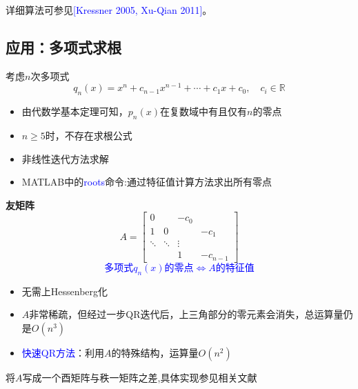 \documentclass[12pt,a4paper]{article}
\begin{document}
详细算法可参见\textcolor{blue}{[Kressner 2005, Xu-Qian 2011]}。
\subsection{应用：多项式求根}
考虑$n$次多项式$$
q_{n}(x)=x^{n}+c_{n-1} x^{n-1}+\cdots+c_{1} x+c_{0}, \quad c_{i} \in \mathbb{R}
$$
\begin{itemize}
	\item 由代数学基本定理可知，$p_n(x)$在复数域中有且仅有$n$的零点
	\item $n\geq 5$时，不存在求根公式
	\item 非线性迭代方法求解
	\item MATLAB中的\textcolor{blue}{roots}命令:通过特征值计算方法求出所有零点
\end{itemize}
\textbf{友矩阵}
$$
A=\left[\begin{array}{cccc}{0} & {} & {-c_{0}} \\ {1} & {0} & {} & {-c_{1}} \\ {\ddots} & {\ddots} & {\vdots} \\ {} & {} & {1} & {-c_{n-1}}\end{array}\right]
$$
\textcolor{blue}{$$
\text{多项式}q_n(x) \text{的零点}\Longleftrightarrow A\text{的特征值}
$$}
\begin{itemize}
	\item 无需上Hessenberg化
	\item $A$非常稀疏，但经过一步QR迭代后，上三角部分的零元素会消失，总运算量仍是$O\left(n^{3}\right)$
	\item \textcolor{blue}{快速QR方法}：利用$A$的特殊结构，运算量$O\left(n^{2}\right)$
\end{itemize}
将$A$写成一个酉矩阵与秩一矩阵之差,具体实现参见相关文献
\end{document}
